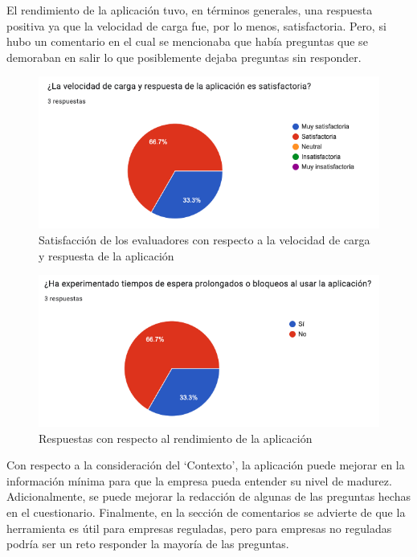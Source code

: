 El rendimiento de la aplicación tuvo, en términos generales, una respuesta positiva ya que la velocidad de carga fue, por lo menos, satisfactoria. Pero, si hubo un comentario en el cual se mencionaba que había preguntas que se demoraban en salir lo que posiblemente dejaba preguntas sin responder. 

\begin{figure}[H]
        \centering
        \includegraphics[scale=0.45]{images/6-validacion/5-rendimiento.png}
        \caption{Satisfacción de los evaluadores con respecto a la velocidad de carga y respuesta de la aplicación}
\end{figure}
 
\begin{figure}[H]
        \centering
        \includegraphics[scale=0.45]{images/6-validacion/6-rendimiento.png}
        \caption{Respuestas con respecto al rendimiento de la aplicación}
\end{figure}
 
  
Con respecto a la consideración del ‘Contexto’, la aplicación puede mejorar en la información mínima para que la empresa pueda entender su nivel de madurez. Adicionalmente, se puede mejorar la redacción de algunas de las preguntas hechas en el cuestionario. Finalmente, en la sección de comentarios se advierte de que la herramienta es útil para empresas reguladas, pero para empresas no reguladas podría ser un reto responder la mayoría de las preguntas. 

